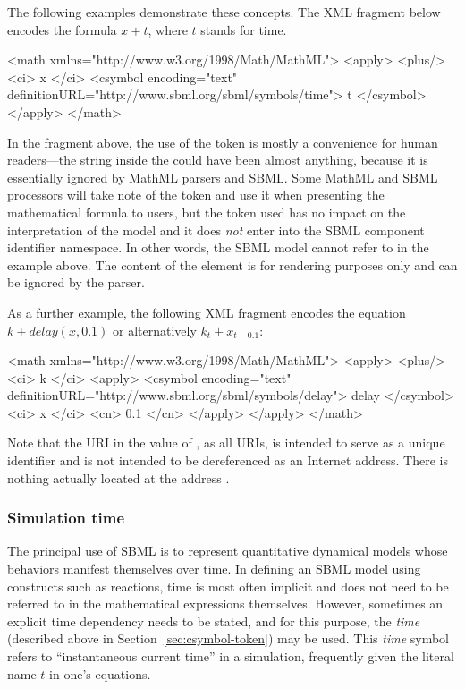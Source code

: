 The following examples demonstrate these concepts.  The XML fragment below
encodes the formula $x + t$, where $t$ stands for time.

\clearpage

\begin{example}
<math xmlns="http://www.w3.org/1998/Math/MathML">
    <apply>
        <plus/>
        <ci> x </ci>
        <csymbol encoding="text" definitionURL="http://www.sbml.org/sbml/symbols/time">
            t
        </csymbol>
    </apply>
</math>
\end{example}

In the fragment above, the use of the token  is mostly a
convenience for human readers---the string inside the
 could have been almost anything, because it is
essentially ignored by MathML parsers and SBML.  Some MathML and
SBML processors will take note of the token and use it when
presenting the mathematical formula to users, but the token used
has no impact on the interpretation of the model and it does
\emph{not} enter into the SBML component identifier namespace.  In
other words, the SBML model cannot refer to  in the
example above.  The content of the  element is for
rendering purposes only and can be ignored by the parser.

As a further example, the following XML fragment encodes the equation
$k + delay(x, 0.1)$ or alternatively $k_t + x_{t - 0.1}$:

\begin{example}
<math xmlns="http://www.w3.org/1998/Math/MathML">
    <apply>
        <plus/>
        <ci> k </ci>
        <apply>
            <csymbol encoding="text" definitionURL="http://www.sbml.org/sbml/symbols/delay">
                delay
            </csymbol>
            <ci> x </ci>
            <cn> 0.1 </cn>
        </apply>
    </apply>
</math>
\end{example}

Note that the URI in the value of , as all
URIs, is intended to serve as a unique identifier and is not
intended to be dereferenced as an Internet address.  There is
nothing actually located at the address
.


\subsubsection{Simulation time}
\label{sec:meaning-of-time}

The principal use of SBML is to represent quantitative dynamical
models whose behaviors manifest themselves over time.  In defining
an SBML model using constructs such as reactions, time is most
often implicit and does not need to be referred to in the
mathematical expressions themselves.  However, sometimes an
explicit time dependency needs to be stated, and for this purpose,
the \emph{time}  (described above in
Section~\ref{sec:csymbol-token}) may be used.  This \emph{time}
symbol refers to ``instantaneous current time'' in a simulation,
frequently given the literal name $t$ in one's equations.

